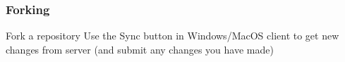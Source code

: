 \documentclass[xcolor=dvipsnames]{beamer}
\begin{document}
%


%





\begin{frame}
\frametitle{Forking}
Fork a repository
Use the Sync button in Windows/MacOS client to get new changes from server (and submit any changes you have made)
\end{frame}
\end{document}
